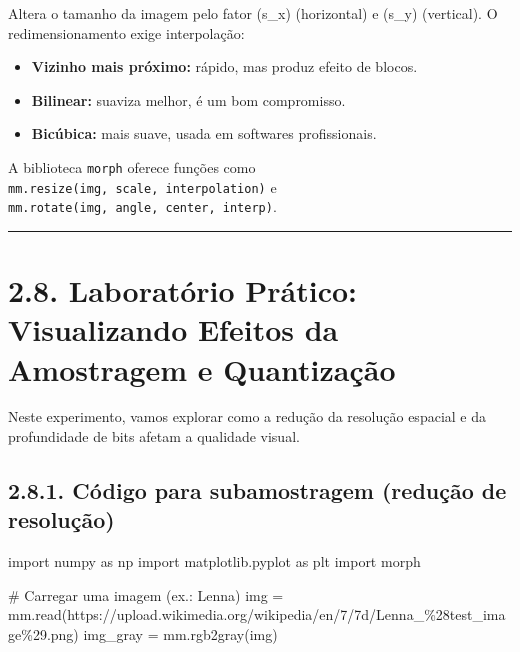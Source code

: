 \documentclass[
  portuguese,
  letterpaper,
  openany,
  oneside,
  12pt,
  a4paper]{book}
\newenvironment{Shaded}{\begin{snugshade}}{\end{snugshade}}
\newcommand{\CommentTok}[1]{\textcolor[rgb]{0.37,0.37,0.37}{#1}}
\newcommand{\ImportTok}[1]{\textcolor[rgb]{0.00,0.46,0.62}{#1}}
\newcommand{\NormalTok}[1]{\textcolor[rgb]{0.00,0.23,0.31}{#1}}
\newcommand{\OperatorTok}[1]{\textcolor[rgb]{0.37,0.37,0.37}{#1}}
\newcommand{\StringTok}[1]{\textcolor[rgb]{0.13,0.47,0.30}{#1}}
\providecommand{\tightlist}{%
  \setlength{\itemsep}{0pt}\setlength{\parskip}{0pt}}
\begin{document}
\begin{tcolorbox}
Altera o tamanho da imagem pelo fator (s\_x) (horizontal) e (s\_y)
(vertical). O redimensionamento exige interpolação:

\begin{itemize}
\tightlist
\item
  \textbf{Vizinho mais próximo:} rápido, mas produz efeito de blocos.
\item
  \textbf{Bilinear:} suaviza melhor, é um bom compromisso.
\item
  \textbf{Bicúbica:} mais suave, usada em softwares profissionais.
\end{itemize}

A biblioteca \texttt{morph} oferece funções como
\texttt{mm.resize(img,\ scale,\ interpolation)} e
\texttt{mm.rotate(img,\ angle,\ center,\ interp)}.

\begin{center}\rule{0.5\linewidth}{0.5pt}\end{center}

\section{2.8. Laboratório Prático: Visualizando Efeitos da Amostragem e
Quantização}\label{laboratuxf3rio-pruxe1tico-visualizando-efeitos-da-amostragem-e-quantizauxe7uxe3o}

Neste experimento, vamos explorar como a redução da resolução espacial e
da profundidade de bits afetam a qualidade visual.

\subsection{2.8.1. Código para subamostragem (redução de
resolução)}\label{cuxf3digo-para-subamostragem-reduuxe7uxe3o-de-resoluuxe7uxe3o}

\begin{Shaded}
\begin{Highlighting}[]
\ImportTok{import}\NormalTok{ numpy }\ImportTok{as}\NormalTok{ np}
\ImportTok{import}\NormalTok{ matplotlib.pyplot }\ImportTok{as}\NormalTok{ plt}
\ImportTok{import}\NormalTok{ morph}

\CommentTok{\# Carregar uma imagem (ex.: Lenna)}
\NormalTok{img }\OperatorTok{=}\NormalTok{ mm.read(}\StringTok{\textquotesingle{}https://upload.wikimedia.org/wikipedia/en/7/7d/Lenna\_\%28test\_image\%29.png\textquotesingle{}}\NormalTok{)}
\NormalTok{img\_gray }\OperatorTok{=}\NormalTok{ mm.rgb2gray(img)}


\end{Highlighting}
\end{Shaded}
\end{tcolorbox}
\end{document}

